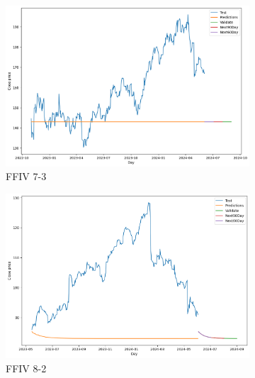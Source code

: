 \documentclass{ieeeojies}
\begin{document}
\begin{figure}[H]
    \centering
    \begin{subfigure}[h]{0.33\linewidth}
        \centering
        \includegraphics[width=\linewidth]{ARIMA Plot/ARIMA_FFIV_7_3.png}
        \caption{FFIV 7-3}
        \label{fig:ffiv-7-3}
    \end{subfigure}%
    \hfill
    \begin{subfigure}[h]{0.33\linewidth}
        \centering
        \includegraphics[width=\linewidth]{ARIMA Plot/ARIMA_FFIV_8_2.png}
        \caption{FFIV 8-2}
        \label{fig:ffiv-8-2}
    \end{subfigure}%
    \hfill
    \begin{subfigure}[h]{0.33\linewidth}
        \centering

\end{subfigure}
\end{figure}
\end{document}

